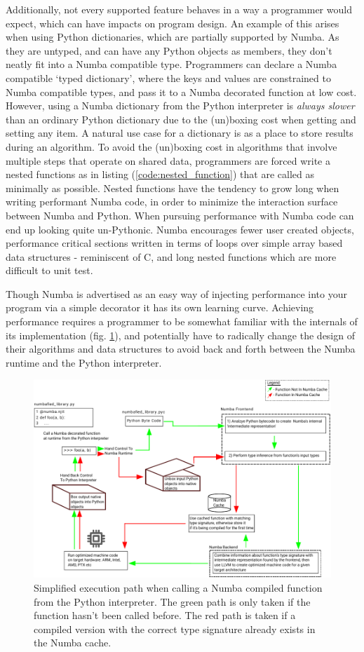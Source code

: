 \documentclass{IEEEcsmag}
\begin{document}
Additionally, not every supported feature behaves in a way a programmer would expect, which can have impacts on program design. An example of this arises when using Python dictionaries, which are partially supported by Numba. As they are untyped, and can have any Python objects as members, they don't neatly fit into a Numba compatible type. Programmers can declare a Numba compatible `typed dictionary', where the keys and values are constrained to Numba compatible types, and pass it to a Numba decorated function at low cost. However, using a Numba dictionary from the Python interpreter is \textit{always slower} than an ordinary Python dictionary due to the (un)boxing cost when getting and setting any item. A natural use case for a dictionary is as a place to store results during an algorithm. To avoid the (un)boxing cost in algorithms that involve multiple steps that operate on shared data, programmers are forced write a nested functions as in listing (\ref{code:nested_function}) that are called as minimally as possible. Nested functions have the tendency to grow long when writing performant Numba code, in order to minimize the interaction surface between Numba and Python. When pursuing performance with Numba code can end up looking quite un-Pythonic. Numba encourages fewer user created objects, performance critical sections written in terms of loops over simple array based data structures - reminiscent of C, and long nested functions which are more difficult to unit test.

Though Numba is advertised as an easy way of injecting performance into your program via a simple decorator it has its own learning curve. Achieving performance requires a programmer to be somewhat familiar with the internals of its implementation (fig. \ref{fig:numba}), and potentially have to radically change the design of their algorithms and data structures to avoid back and forth between the Numba runtime and the Python interpreter.

\begin{figure}
    \centerline{\includegraphics {figures/numba.pdf}}
    \caption{Simplified execution path when calling a Numba compiled function from the Python interpreter. The green path is only taken if the function hasn't been called before. The red path is taken if a compiled version with the correct type signature already exists in the Numba cache.}
    \label{fig:numba}
\end{figure}
\end{document}
